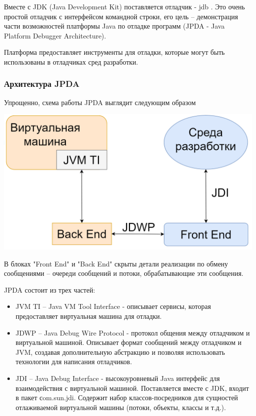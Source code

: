 Вместе с JDK (Java Development Kit) поставляется отладчик - jdb \cite{debug:jdb}. Это очень простой отладчик с интерфейсом командной строки, его цель -- демонстрация части возможностей платформы Java по отладке программ (JPDA - Java Platform Debugger Architecture). 

Платформа предоставляет инструменты для отладки, которые могут быть использованы в отладчиках сред разработки.

\subsubsection{Архитектура JPDA}\label{jdpa}
Упрощенно, схема работы JPDA выглядит следующим образом

\vspace{1em}
\includegraphics[scale=0.4]{chapter1/img/jdpa.png}

В блоках "Front End" и "Back End" скрыты детали реализации по обмену сообщениями -- очереди сообщений и потоки, обрабатывающие эти сообщения.

JPDA состоит из трех частей:
\begin{itemize}
	\item JVM TI -- Java VM Tool Interface - описывает сервисы, которая предоставляет виртуальная машина для отладки. 
	\item JDWP -- Java Debug Wire Protocol - протокол общения между отладчиком и виртуальной машиной. Описывает формат сообщений между отладчиком и JVM, создавая дополнительную абстракцию и позволяя использовать технологии для написания отладчиков.
	\item JDI -- Java Debug Interface - высокоуровневый Java интерфейс для взаимодействия с виртуальной машиной. Поставляется вместе с JDK, входит в пакет сom.sun.jdi. Содержит набор классов-посредников для сущностей отлаживаемой виртуальной машины (потоки, объекты, классы и т.д.).
\end{itemize}



